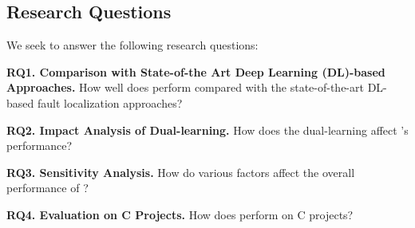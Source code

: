\subsection{Research Questions}

We seek to answer the following research questions:

\noindent\textbf{RQ1. Comparison with State-of-the Art Deep Learning
  (DL)-based Approaches.}  How well does {\tool} perform compared with
the state-of-the-art DL-based fault localization approaches?

\noindent\textbf{RQ2. Impact Analysis of Dual-learning.} 
How does the dual-learning affect {\tool}'s performance?

\noindent\textbf{RQ3. Sensitivity Analysis.} How do various factors affect the overall performance of {\tool}?


\noindent\textbf{RQ4. Evaluation on C Projects.} How does {\tool} perform on C projects?
